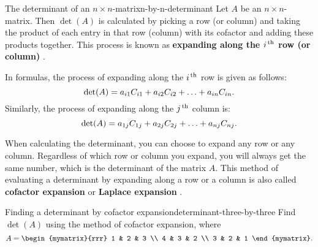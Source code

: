 \begin{definition}{The determinant of an $n\times n$-matrix}{n-by-n-determinant}
  Let $A$ be an $n\times n$-matrix. Then $\det(A)$ is calculated by
  picking a row (or column) and taking the product of each entry in
  that row (column) with its cofactor and adding these products
  together. This process is known as \textbf{expanding along the
    $i\th$ row (or column)}%
  .
  \bigskip
  
  In formulas, the process of expanding along the $i\th$ row is given
  as follows:
  \begin{equation*}
    \det(A) =
    a_{i1}\cofactor{A}{i1} + a_{i2}\cofactor{A}{i2} + \ldots + a_{in}\cofactor{A}{in}.
  \end{equation*}
  Similarly, the process of expanding along the $j\th$ column is:
  \begin{equation*}
    \det(A) =
    a_{1j}\cofactor{A}{1j} + a_{2j}\cofactor{A}{2j} + \ldots + a_{nj}\cofactor{A}{nj}.
  \end{equation*}
  
\end{definition}

When calculating the determinant, you can choose to expand any row or
any column. Regardless of which row or column you expand, you will
always get the same number, which is the determinant of the matrix
$A$.  This method of evaluating a determinant by expanding along a row
or a column is also called \textbf{cofactor expansion}%
%
 or \textbf{Laplace expansion}%
%
.

\begin{example}{Finding a determinant by cofactor expansion}{determinant-three-by-three}
  Find $\det(A)$ using the method of cofactor expansion, where
  \begin{equation*}
    A = \begin{mymatrix}{rrr}
      1 & 2 & 3 \\
      4 & 3 & 2 \\
      3 & 2 & 1
    \end{mymatrix}.
  \end{equation*}
\end{example}

